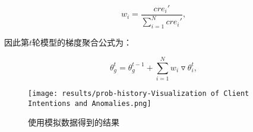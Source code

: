 \documentclass[lettersize,journal]{IEEEtran}
\begin{document}
\begin{enumerate}
\begin{equation}
    w_i=\frac{cre_i'}{\sum_{i=1}^{N}cre_i'},
\end{equation}

因此第$t$轮模型的梯度聚合公式为：

\begin{equation}
    \theta_g^t = \theta_g^{t-1}+\sum_{i=1}^{N}w_i\triangledown \theta_i^t,
\end{equation}

\begin{figure}[!t]
    \centering
    \texttt{[image: results/prob-history-Visualization of Client Intentions and Anomalies.png]}
    \centering \caption{使用模拟数据得到的结果}
    \label{fig:result-of-histry}
\end{figure}












\end{enumerate}
\end{document}
